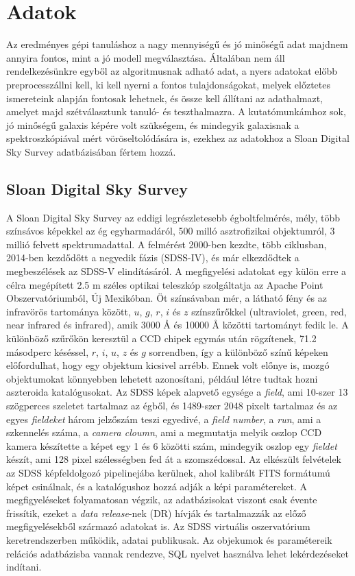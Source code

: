 \documentclass[12pt,letterpaper,twoside,openright]{book}
\begin{document}
 
 
  \chapter{Adatok}
 Az eredményes gépi tanuláshoz a nagy mennyiségű és jó minőségű adat majdnem annyira fontos, mint a jó modell megválasztása. Általában nem áll  rendelkezésünkre egyből az algoritmusnak adható adat, a nyers adatokat előbb preprocesszállni kell, ki kell nyerni a fontos tulajdonságokat, melyek előztetes ismereteink alapján fontosak lehetnek, és össze kell állítani az adathalmazt, amelyet majd  szétválasztunk tanuló- és teszthalmazra. 
 \newline \indent 
 A kutatómunkámhoz sok, jó minőségű galaxis képére volt szükségem, és mindegyik galaxisnak a spektroszkópiával mért vöröseltolódására is, ezekhez az adatokhoz a Sloan Digital Sky Survey adatbázisában fértem hozzá. 
 \section{Sloan Digital Sky Survey}
 A Sloan Digital Sky Survey az eddigi legrészletesebb égboltfelmérés, mély, több színsávos képekkel az ég egyharmadáról, 500 milló asztrofizikai objektumról, 3 millió felvett spektrumadattal. A felmérést 2000-ben kezdte, több ciklusban, 2014-ben kezdődőtt a negyedik fázis (SDSS-IV), és már elkezdődtek a megbeszélések az SDSS-V elindításáról\cite{sdssV}. A megfigyelési adatokat egy külön erre a célra megépített 2.5 m széles optikai teleszkóp szolgáltatja az Apache Point Obszervatóriumból, Új Mexikóban.
 Öt színsávaban mér, a látható fény és az infravörös tartománya között,  $u$, $g$, $r$, $i$ és $z$ színszűrőkkel (ultraviolet, green, red, near infrared és infrared), amik 3000 \AA\text{ }  és 10000 \AA\text{ }  közötti tartományt fedik le. A különböző szűrőkön keresztül a CCD chipek egymás után rögzítenek, 71.2 másodperc késéssel, $r$, $i$, $u$, $z$ és $g$ sorrendben, így a különböző színű képeken előfordulhat, hogy egy objektum kicsivel arrébb. Ennek volt előnye is, mozgó objektumokat könnyebben lehetett azonosítani, például létre tudtak hozni aszteroida katalógusokat. Az SDSS képek alapvető egysége a \textit{field}, ami 10-szer 13 szögperces szeletet tartalmaz az égből, és 1489-szer 2048 pixelt tartalmaz és az egyes \textit{fieldeket} három jelzőszám teszi egyedivé, a \textit{field number},  a \textit{run}, ami a szkennelés száma, a \textit{camera cloumn}, ami a megmutatja melyik oszlop CCD kamera készítette a képet egy 1 és 6 közötti szám, mindegyik oszlop egy \textit{fieldet} készít, ami 128 pixel szélességben fed át a szomszédossal.  Az elkészült felvételek az SDSS képfeldolgozó pipelinejába kerülnek, ahol kalibrált FITS formátumú képet csinálnak, és a katalógushoz hozzá adják a képi paramétereket.
 \newline \indent
 A megfigyeléseket folyamatosan végzik, az adatbázisokat viszont csak évente frissítik, ezeket a \textit{data release}-nek (DR) hívják és tartalmazzák az előző megfigyelésekből származó adatokat is. Az SDSS virtuális oszervatórium keretrendszerben működik, adatai publikusak. Az objekumok és paramétereik relációs adatbázisba vannak rendezve, SQL nyelvet használva lehet lekérdezéseket indítani.
\end{document}
